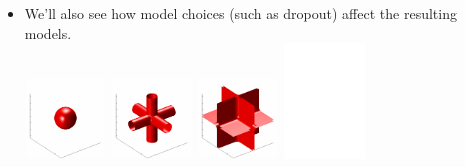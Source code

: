 {\begin{itemize}
\begin{tabular}{cccc}
\end{tabular}
	\item We'll also see how model choices (such as dropout) affect the resulting models.
	\\
	\includegraphics[width=0.17\textwidth]{figures/3d-kernel/3d_add_kernel_3}
	\includegraphics[width=0.17\textwidth]{figures/3d-kernel/3d_add_kernel_2}
	\includegraphics[width=0.17\textwidth]{figures/3d-kernel/3d_add_kernel_1}
	\includegraphics[width=0.17\textwidth]{figures/3d-kernel/3d_add_kernel_321}
\end{itemize}
}



